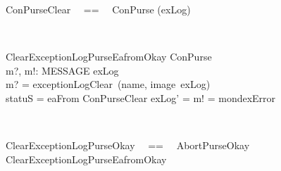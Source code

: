 \begin{LSDef}
\begin{zed}
   ConPurseClear ~~==~~ ConPurse \hide (exLog)
\end{zed}~\end{LSDef}

\begin{LSDef}
\begin{schema}{ClearExceptionLogPurseEafromOkay}
   \Delta ConPurse \\
   m?, m!: MESSAGE
\where
   exLog \neq \emptyset \\
   m? = exceptionLogClear~(name, image~exLog) \\
   statuS = eaFrom
   \also
   \Xi ConPurseClear
   \also
   exLog' = \emptyset
   \also
   m! = mondexError
\end{schema}~\end{LSDef}

\begin{LSDef}
\begin{zed}
   ClearExceptionLogPurseOkay ~~==~~ AbortPurseOkay \semi ClearExceptionLogPurseEafromOkay
\end{zed}~\end{LSDef}

